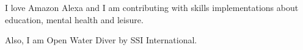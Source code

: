 

\begin{cvparagraph}

I love Amazon Alexa and I am contributing with skills implementations about education, mental health and leisure.

Also, I am Open Water Diver by SSI International.
\end{cvparagraph}